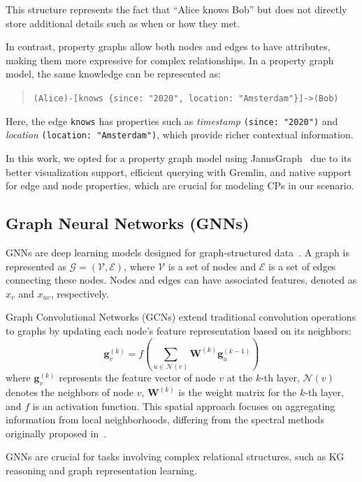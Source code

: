 \documentclass[letterpaper]{article} %
\begin{document}
This structure represents the fact that ``Alice knows Bob'' but does not directly store additional details such as when or how they met. 

In contrast, property graphs allow both nodes and edges to have attributes, making them more expressive for complex relationships. In a property graph model, the same knowledge can be represented as:

\begin{quote}
    \texttt{(Alice)-[knows \{since: "2020", location: "Amsterdam"\}]->(Bob)}
\end{quote}

Here, the edge \texttt{knows} has properties such as \textit{timestamp} \texttt{(since: "2020")} and \textit{location} \texttt{(location: "Amsterdam")}, which provide richer contextual information. 

In this work, we opted for a property graph model using JanusGraph~\cite{janusgraph_2024} due to its better visualization support, efficient querying with Gremlin, and native support for edge and node properties, which are crucial for modeling CPs in our scenario.


\subsection{Graph Neural Networks (GNNs)}
\label{sec:gnn}

GNNs are deep learning models designed for graph-structured data~\cite{4700287}. A graph is represented as $\mathcal{G} = (\mathcal{V}, \mathcal{E})$, where $\mathcal{V}$ is a set of nodes and $\mathcal{E}$ is a set of edges connecting these nodes. Nodes and edges can have associated features, denoted as $x_v$ and $x_{uv}$, respectively.

Graph Convolutional Networks (GCNs) extend traditional convolution operations to graphs by updating each node's feature representation based on its neighbors:
\[
\bm{g}_v^{(k)} = f\left( \sum_{u \in \mathcal{N}(v)} \bm{W}^{(k)} \bm{g}_u^{(k-1)} \right)
\]
where \( \bm{g}_v^{(k)} \) represents the feature vector of node \( v \) at the \( k \)-th layer, \( \mathcal{N}(v) \) denotes the neighbors of node \( v \), \( \bm{W}^{(k)} \) is the weight matrix for the \( k \)-th layer, and \( f \) is an activation function. This spatial approach focuses on aggregating information from local neighborhoods, differing from the spectral methods originally proposed in~\cite{DBLP:journals/corr/KipfW16}.

GNNs are crucial for tasks involving complex relational structures, such as KG reasoning and graph representation learning.
\end{document}
